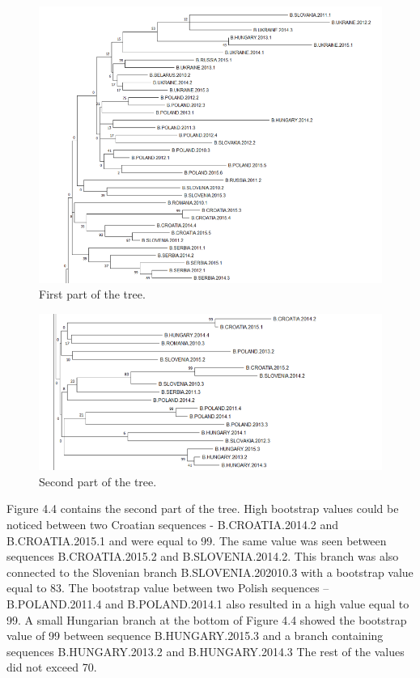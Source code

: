 \begin{figure}[h]
  \centering
  \includegraphics[width=0.7
\textwidth]{images/1.png}
  \caption{First part of the tree.}
  \label{fig: First part of the tree.}
\end{figure}
  
\begin{figure}[h]
  \centering
  \includegraphics[width=0.7
\textwidth]{images/2.png}
  \caption{Second part of the tree.}
  \label{fig: Second part of the tree.}
\end{figure}

Figure 4.4 contains the second part of the tree.
High bootstrap values could be noticed between two Croatian sequences - B.CROATIA.2014.2 and B.CROATIA.2015.1 and were equal to 99.
The same value was seen between sequences B.CROATIA.2015.2 and B.SLOVENIA.2014.2. 
This branch was also connected to the Slovenian branch B.SLOVENIA.202010.3 with a bootstrap value equal to 83.
The bootstrap value between two Polish sequences – B.POLAND.2011.4 and B.POLAND.2014.1 also resulted in a high value equal to 99. 
A small Hungarian branch at the bottom of Figure 4.4 showed the bootstrap value of 99 between sequence B.HUNGARY.2015.3 and a branch containing sequences B.HUNGARY.2013.2 and B.HUNGARY.2014.3
The rest of the values did not exceed 70.

